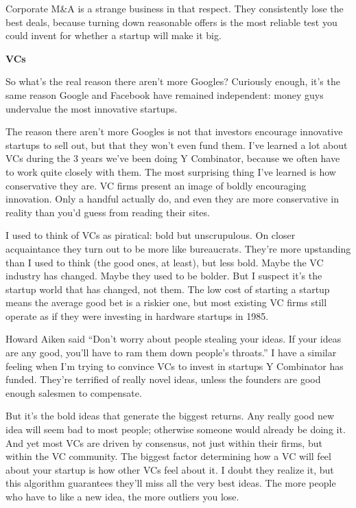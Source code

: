 \documentclass[12pt]{book}
\begin{document}
Corporate M\&A is a strange business in that respect. They consistently
lose the best deals, because turning down reasonable offers is the most
reliable test you could invent for whether a startup will make it big.

\textbf{VCs}

So what's the real reason there aren't more Googles? Curiously enough,
it's the same reason Google and Facebook have remained independent:
money guys undervalue the most innovative startups.

The reason there aren't more Googles is not that investors encourage
innovative startups to sell out, but that they won't even fund them.
I've learned a lot about VCs during the 3 years we've been doing Y
Combinator, because we often have to work quite closely with them. The
most surprising thing I've learned is how conservative they are. VC
firms present an image of boldly encouraging innovation. Only a handful
actually do, and even they are more conservative in reality than you'd
guess from reading their sites.

I used to think of VCs as piratical: bold but unscrupulous. On closer
acquaintance they turn out to be more like bureaucrats. They're more
upstanding than I used to think (the good ones, at least), but less
bold. Maybe the VC industry has changed. Maybe they used to be bolder.
But I suspect it's the startup world that has changed, not them. The low
cost of starting a startup means the average good bet is a riskier one,
but most existing VC firms still operate as if they were investing in
hardware startups in 1985.

Howard Aiken said ``Don't worry about people stealing your ideas. If
your ideas are any good, you'll have to ram them down people's
throats.'' I have a similar feeling when I'm trying to convince VCs to
invest in startups Y Combinator has funded. They're terrified of really
novel ideas, unless the founders are good enough salesmen to compensate.

But it's the bold ideas that generate the biggest returns. Any really
good new idea will seem bad to most people; otherwise someone would
already be doing it. And yet most VCs are driven by consensus, not just
within their firms, but within the VC community. The biggest factor
determining how a VC will feel about your startup is how other VCs feel
about it. I doubt they realize it, but this algorithm guarantees they'll
miss all the very best ideas. The more people who have to like a new
idea, the more outliers you lose.
\end{document}

